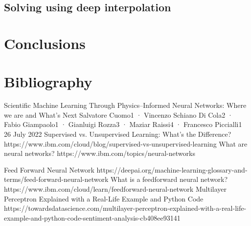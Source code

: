 \documentclass{article}
\begin{document}
\subsection{Solving using deep interpolation}



\section{Conclusions}

\newpage

\section{Bibliography}
 {Scientific Machine Learning Through Physics–Informed Neural Networks: Where we are and What’s Next}
Salvatore Cuomo1 · Vincenzo Schiano Di Cola2 · Fabio Giampaolo1 · Gianluigi Rozza3 · Maziar Raissi4 · Francesco Piccialli1
26 July 2022
 {Supervised vs. Unsupervised Learning: What’s the Difference?} {https://www.ibm.com/cloud/blog/supervised-vs-unsupervised-learning}
 {What are neural networks?} {https://www.ibm.com/topics/neural-networks}

 {Feed Forward Neural Network} {https://deepai.org/machine-learning-glossary-and-terms/feed-forward-neural-network}
 {What is a feedforward neural network?} {https://www.ibm.com/cloud/learn/feedforward-neural-network}
 {Multilayer Perceptron Explained with a Real-Life Example and Python Code} {https://towardsdatascience.com/multilayer-perceptron-explained-with-a-real-life-example-and-python-code-sentiment-analysis-cb408ee93141}
\end{document}

